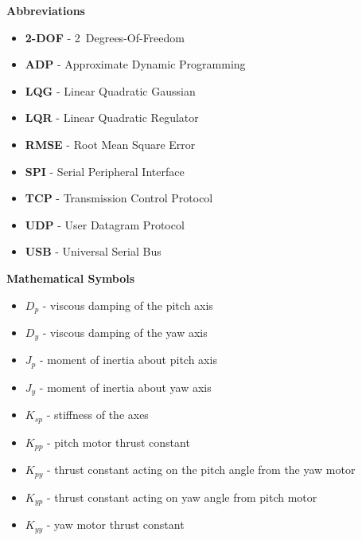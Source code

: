 
\renewcommand{\nomname}{Nomenclature}
\renewcommand{\nomAname}{\textbf{\large Abbreviations}}
\renewcommand{\nomGname}{\textbf{\large Mathematical Symbols}}
\renewcommand{\nomXname}{\textbf{\large Superscripts}}
\renewcommand{\nomZname}{\textbf{\large Subscripts}}

\printnomenclature
\cleardoublepage
{} %


\nomAname
\bigbreak
\begin{itemize}
    \item[]\textbf{2-DOF} - 2~Degrees-Of-Freedom
    \item[]\textbf{ADP} - Approximate Dynamic Programming
    \item[] \textbf{LQG} - Linear Quadratic Gaussian
    \item[]\textbf{LQR} - Linear Quadratic Regulator
    \item[]\textbf{RMSE} - Root Mean Square Error
    \item[]\textbf{SPI} - Serial Peripheral Interface
    \item[]\textbf{TCP} - Transmission Control Protocol
    \item[]\textbf{UDP} - User Datagram Protocol
    \item[]\textbf{USB} - Universal Serial Bus
\end{itemize}

\nomGname
\bigbreak
\begin{itemize}
    \item[]$D_p$ - viscous damping of the pitch axis
    \item[]$D_y$ - viscous damping of the yaw axis
    \item[]$J_p$ - moment of inertia about pitch axis
    \item[]$J_y$ - moment of inertia about yaw axis
    \item[]$K_{sp}$ - stiffness of the axes
    \item[]$K_{pp}$ - pitch motor thrust constant
    \item[]$K_{py}$ - thrust constant acting on the pitch angle from the yaw motor
    \item[]$K_{yp}$ - thrust constant acting on yaw angle from pitch motor
    \item[]$K_{yy}$ - yaw motor thrust constant
\end{itemize}


